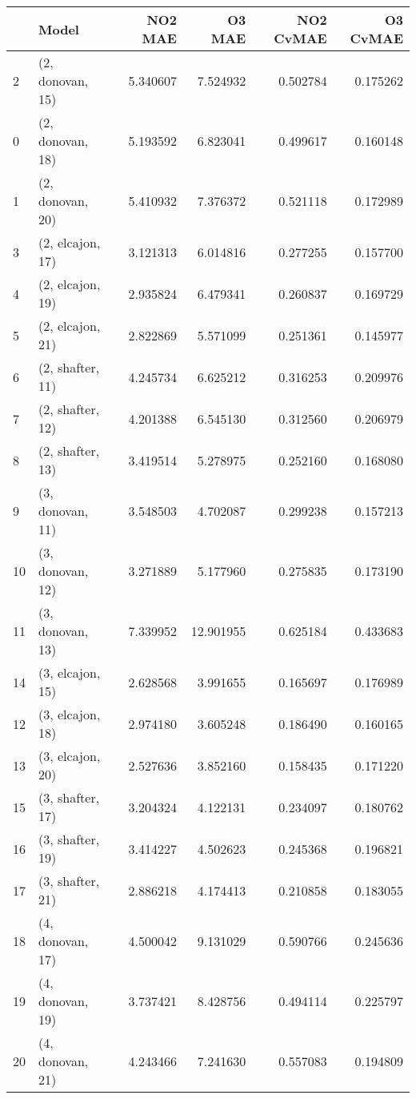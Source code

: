 \begin{tabular}{llrrrr}
\toprule
{} &             Model &    NO2 MAE &     O3 MAE &  NO2 CvMAE &  O3 CvMAE \\
\midrule
2  &  (2, donovan, 15) &   5.340607 &   7.524932 &   0.502784 &  0.175262 \\
0  &  (2, donovan, 18) &   5.193592 &   6.823041 &   0.499617 &  0.160148 \\
1  &  (2, donovan, 20) &   5.410932 &   7.376372 &   0.521118 &  0.172989 \\
3  &  (2, elcajon, 17) &   3.121313 &   6.014816 &   0.277255 &  0.157700 \\
4  &  (2, elcajon, 19) &   2.935824 &   6.479341 &   0.260837 &  0.169729 \\
5  &  (2, elcajon, 21) &   2.822869 &   5.571099 &   0.251361 &  0.145977 \\
6  &  (2, shafter, 11) &   4.245734 &   6.625212 &   0.316253 &  0.209976 \\
7  &  (2, shafter, 12) &   4.201388 &   6.545130 &   0.312560 &  0.206979 \\
8  &  (2, shafter, 13) &   3.419514 &   5.278975 &   0.252160 &  0.168080 \\
9  &  (3, donovan, 11) &   3.548503 &   4.702087 &   0.299238 &  0.157213 \\
10 &  (3, donovan, 12) &   3.271889 &   5.177960 &   0.275835 &  0.173190 \\
11 &  (3, donovan, 13) &   7.339952 &  12.901955 &   0.625184 &  0.433683 \\
14 &  (3, elcajon, 15) &   2.628568 &   3.991655 &   0.165697 &  0.176989 \\
12 &  (3, elcajon, 18) &   2.974180 &   3.605248 &   0.186490 &  0.160165 \\
13 &  (3, elcajon, 20) &   2.527636 &   3.852160 &   0.158435 &  0.171220 \\
15 &  (3, shafter, 17) &   3.204324 &   4.122131 &   0.234097 &  0.180762 \\
16 &  (3, shafter, 19) &   3.414227 &   4.502623 &   0.245368 &  0.196821 \\
17 &  (3, shafter, 21) &   2.886218 &   4.174413 &   0.210858 &  0.183055 \\
18 &  (4, donovan, 17) &   4.500042 &   9.131029 &   0.590766 &  0.245636 \\
19 &  (4, donovan, 19) &   3.737421 &   8.428756 &   0.494114 &  0.225797 \\
20 &  (4, donovan, 21) &   4.243466 &   7.241630 &   0.557083 &  0.194809 \\

\end{tabular}

